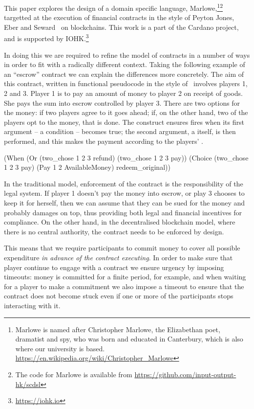 \documentclass[
      acmsmall
    , screen
  ]{acmart}
\begin{document}
This paper explores the design of a domain specific language, Marlowe,\footnote{Marlowe is named after Christopher Marlowe, the Elizabethan poet, dramatist and spy, who was born and educated in Canterbury, which is also where our university is based. \url{https://en.wikipedia.org/wiki/Christopher_Marlowe}}\footnote{The code for Marlowe is available from \url{https://github.com/input-output-hk/scdsl}
} targetted at the execution of financial contracts in the style of Peyton Jones, Eber and Seward~\cite{PeytonJones:2000} on blockchains. This work is a part of the Cardano project, and is supported by IOHK.\footnote{\url{https://iohk.io}}

In doing this we are required to refine the model of contracts in a number of ways in order to fit with a radically different context. Taking the following example of an ``escrow'' contract we can explain the differences more concretely. The aim of this contract, written in functional pseudocode in the style of~\cite{PeytonJones:2000} involves players 1, 2 and 3. Player 1 is to pay an amount of money to player 2 on receipt of goods. She pays the sum into escrow controlled by player 3. There are two options for the money: if two players agree to  it goes ahead; if, on the other hand, two of the players opt to  the money, that is done. The  construct ensures fires when its first argument -- a condition -- becomes true; the second argument, a  itself, is then performed, and this makes the payment according to the players' .

\begin{haskellcode}
(When (Or (two_chose 1 2 3 refund)
          (two_chose 1 2 3 pay))
      (Choice (two_chose 1 2 3 pay)
              (Pay 1 2 AvailableMoney)
              redeem_original))
\end{haskellcode}

In the traditional model, enforcement of the contract is the responsibility of the legal system. If player 1 doesn't pay the money into escrow, or play 3 chooses to keep it for herself, then we can assume that they can be sued for the money and probably damages on top, thus providing both legal and financial incentives for compliance. On the other hand, in the decentralised blockchain model, where there is no central authority, the contract needs to be enforced by design. 

This means that we require participants to commit money to cover all possible expenditure \emph{in advance of the contract executing}. In order to make sure that player continue to engage with a contract we ensure urgency by imposing timeouts: money is committed for a finite period, for example, and when waiting for a player to make a commitment we also impose a timeout to ensure that the contract does not become stuck even if one or more of the participants stops interacting with it.
\end{document}
